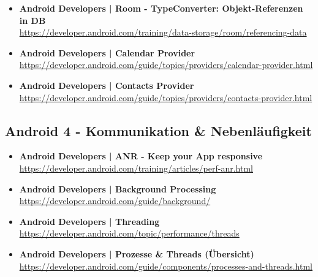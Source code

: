 \documentclass[a4paper]{article}
\begin{document}
{\begin{itemize}
		\item \textbf{Android Developers | Room - TypeConverter: Objekt-Referenzen in DB}\\
		\href{https://developer.android.com/training/data-storage/room/referencing-data}
		{https://developer.android.com/training/data-storage/room/referencing-data}
		
		\item \textbf{Android Developers | Calendar Provider}\\
		\href{https://developer.android.com/guide/topics/providers/calendar-provider.html}
		{https://developer.android.com/guide/topics/providers/calendar-provider.html}
		
		\item \textbf{Android Developers | Contacts Provider}\\
		\href{https://developer.android.com/guide/topics/providers/contacts-provider.html}
		{https://developer.android.com/guide/topics/providers/contacts-provider.html}
		
		
	\end{itemize}
	
	\subsection{Android 4 - Kommunikation \& Nebenläufigkeit}
	
	\begin{itemize}
		
		\item \textbf{Android Developers | ANR - Keep your App responsive}\\
		\href{https://developer.android.com/training/articles/perf-anr.html}
		{https://developer.android.com/training/articles/perf-anr.html}
		
		\item \textbf{Android Developers | Background Processing}\\
		\href{https://developer.android.com/guide/background/}
		{https://developer.android.com/guide/background/}
		
		\item \textbf{Android Developers | Threading}\\
		\href{https://developer.android.com/topic/performance/threads}
		{https://developer.android.com/topic/performance/threads}
		
		\item \textbf{Android Developers | Prozesse \& Threads (Übersicht)}\\
		\href{https://developer.android.com/guide/components/processes-and-threads.html}
		{https://developer.android.com/guide/components/processes-and-threads.html}
		

\end{itemize}}
\end{document}
